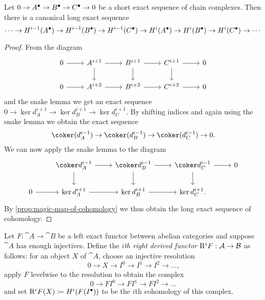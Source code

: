 \begin{lem}[name=Long exact sequence of cohomology]
	Let $0 \to {A}^\bullet \to {B}^\bullet \to {C}^\bullet \to 0$ be a short exact sequence of chain complexes. Then there is a canonical long exact sequence 
	\[
    	\cdots \to \cohomology^{i-1}(\cochaincomplex{A}) \to \cohomology^{i-1}(\cochaincomplex{B}) \to \cohomology^{i-1}(\cochaincomplex{C}) \to \cohomology^{i}(\cochaincomplex{A}) \to \cohomology^{i}(\cochaincomplex{B}) \to \cohomology^{i}(\cochaincomplex{C}) \to \cdots 
    \]
\end{lem}
\begin{proof}
	From the diagram 	\[\begin{tikzcd}
	0 & {A^{i+1}} & {B^{i+1}} & {C^{i+1}} & 0 \\
	0 & {A^{i+2}} & {B^{i+2}} & {C^{i+2}} & 0
	\arrow[from=1-1, to=1-2]
	\arrow[from=1-2, to=1-3]
	\arrow[from=1-2, to=2-2]
	\arrow[from=1-3, to=1-4]
	\arrow[from=1-3, to=2-3]
	\arrow[from=1-4, to=1-5]
	\arrow[from=1-4, to=2-4]
	\arrow[from=2-1, to=2-2]
	\arrow[from=2-2, to=2-3]
	\arrow[from=2-3, to=2-4]
	\arrow[from=2-4, to=2-5]
\end{tikzcd}\] and the snake lemma we get an exact sequence $0 \to \ker d^{i+1}_A \to \ker d^{i+1}_B \to \ker d^{i+1}_C$. 
By shifting indices and again using the snake lemma we obtain the exact sequence \[\coker(d^{i-1}_A) \to \coker(d^{i-1}_B) \to \coker(d^{i-1}_C) \to 0.\]
We can now apply the snake lemma to the diagram
\[\begin{tikzcd}
	& {\coker d^{i-1}_A} & {\coker d^{i-1}_B} & {\coker d^{i-1}_C} & 0 \\
	0 & {\ker d^{i+1}_A} & {\ker d^{i+1}_B} & {\ker d^{i+1}_C}.
	\arrow[from=1-2, to=1-3]
	\arrow[from=1-2, to=2-2]
	\arrow[from=1-3, to=1-4]
	\arrow[from=1-3, to=2-3]
	\arrow[from=1-4, to=1-5]
	\arrow[from=1-4, to=2-4]
	\arrow[from=2-1, to=2-2]
	\arrow[from=2-2, to=2-3]
	\arrow[from=2-3, to=2-4]
\end{tikzcd}\]
By \cref{prop:magic-map-of-cohomology} we thus obtain the long exact sequence of cohomology.
\end{proof}
\begin{defn}
Let \(F\colon\cat A\to\cat B\) be a left exact functor between abelian categories and suppose \(\cat A\) has enough injectives.
Define the \emph{\(i\)th right derived functor} \(\rightderived^iF\colon\cat A\to\cat B\) as follows: for an object \(X\) of \(\cat A\), choose an injective resolution
\[ 0\to X\to I^0\to I^1\to I^2\to\ldots\text{,} \]
apply \(F\) levelwise to the resolution to obtain the complex
\[ 0\to FI^0\to FI^1\to FI^2\to\ldots \]
and set \(\mathrm{R}^iF(X)\coloneq H^i(F(I^\bullet))\) to be the \(i\)th cohomology of this complex.
\end{defn}

